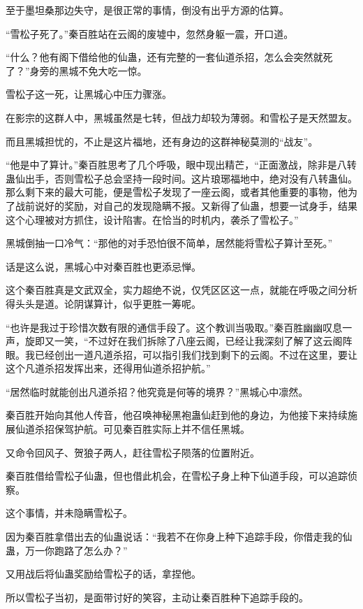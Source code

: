 \begin{this_body}
至于墨坦桑那边失守，是很正常的事情，倒没有出乎方源的估算。

“雪松子死了。”秦百胜站在云阁的废墟中，忽然身躯一震，开口道。

“什么？他有阁下借给他的仙蛊，还有完整的一套仙道杀招，怎么会突然就死了？”身旁的黑城不免大吃一惊。

雪松子这一死，让黑城心中压力骤涨。

在影宗的这群人中，黑城虽然是七转，但战力却较为薄弱。和雪松子是天然盟友。

而且黑城担忧的，不止是这片福地，还有身边的这群神秘莫测的“战友”。

“他是中了算计。”秦百胜思考了几个呼吸，眼中现出精芒，“正面激战，除非是八转蛊仙出手，否则雪松子总会坚持一段时间。这片琅琊福地中，绝对没有八转蛊仙。那么剩下来的最大可能，便是雪松子发现了一座云阁，或者其他重要的事物，他为了战前说好的奖励，对自己的发现隐瞒不报。又新得了仙蛊，想要一试身手，结果这个心理被对方抓住，设计陷害。在恰当的时机内，袭杀了雪松子。”

黑城倒抽一口冷气：“那他的对手恐怕很不简单，居然能将雪松子算计至死。”

话是这么说，黑城心中对秦百胜也更添忌惮。

这个秦百胜真是文武双全，实力超绝不说，仅凭区区这一点，就能在呼吸之间分析得头头是道。论阴谋算计，似乎更胜一筹呢。

“也许是我过于珍惜次数有限的通信手段了。这个教训当吸取。”秦百胜幽幽叹息一声，旋即又一笑，“不过好在我们拆除了八座云阁，已经让我深刻了解了这云阁阵眼。我已经创出一道凡道杀招，可以指引我们找到剩下的云阁。不过在这里，要让这个凡道杀招发挥出来，还得用仙道杀招护航。”

“居然临时就能创出凡道杀招？他究竟是何等的境界？”黑城心中凛然。

秦百胜开始向其他人传音，他召唤神秘黑袍蛊仙赶到他的身边，为他接下来持续施展仙道杀招保驾护航。可见秦百胜实际上并不信任黑城。

又命令回风子、贺狼子两人，赶往雪松子陨落的位置附近。

秦百胜借给雪松子仙蛊，但也借此机会，在雪松子身上种下仙道手段，可以追踪侦察。

这个事情，并未隐瞒雪松子。

因为秦百胜拿借出去的仙蛊说话：“我若不在你身上种下追踪手段，你借走我的仙蛊，万一你跑路了怎么办？”

又用战后将仙蛊奖励给雪松子的话，拿捏他。

所以雪松子当初，是面带讨好的笑容，主动让秦百胜种下追踪手段的。


\end{this_body}
